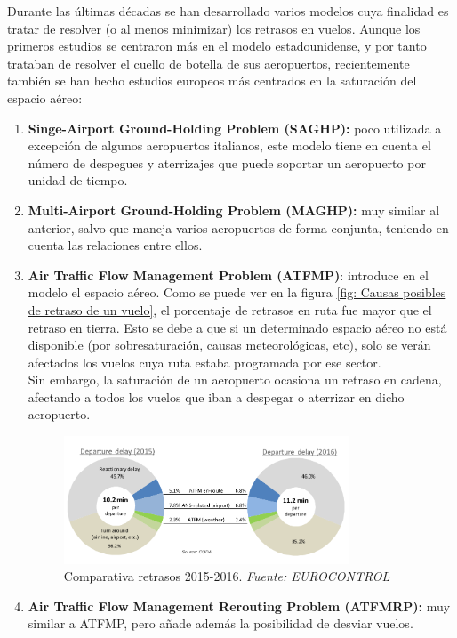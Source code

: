 Durante las últimas décadas se han desarrollado varios modelos cuya finalidad es tratar de resolver (o al menos minimizar) los retrasos en vuelos. Aunque los primeros estudios se centraron más en el modelo estadounidense, y por tanto trataban de resolver el cuello de botella de sus aeropuertos, recientemente también se han hecho estudios europeos más centrados en la saturación del espacio aéreo: 
\begin{enumerate}
	\item \textbf{Singe-Airport Ground-Holding Problem (SAGHP):} poco utilizada a excepción de algunos aeropuertos italianos, este modelo tiene en cuenta el número de despegues y aterrizajes que puede soportar un aeropuerto por unidad de tiempo.
	\item \textbf{Multi-Airport Ground-Holding Problem (MAGHP): }muy similar al anterior, salvo que maneja varios aeropuertos de forma conjunta, teniendo en cuenta las relaciones entre ellos.
	\item \textbf{Air Traffic Flow Management Problem (ATFMP)}: introduce en el modelo el espacio aéreo. Como se puede ver en la figura \ref{fig: Causas posibles de retraso de un vuelo}, el porcentaje de retrasos en ruta fue mayor que el retraso en tierra. Esto se debe a que si un determinado espacio aéreo no está disponible (por sobresaturación, causas meteorológicas, etc), solo se verán afectados los vuelos cuya ruta estaba programada por ese sector.\\
	Sin embargo, la saturación de un aeropuerto ocasiona un retraso en cadena, afectando a todos los vuelos que iban a despegar o aterrizar en dicho aeropuerto.
	\begin{figure}[h]
		\begin{center}
			\centering
			\includegraphics[width=0.8\textwidth]{./imagenes/introduccion/retrasosSalida.png}
			\caption{Comparativa retrasos 2015-2016. \textit{Fuente: EUROCONTROL}}
			\label{fig: Comparativa retrasos 2015-2016}
		\end{center}
	\end{figure}
	\item \textbf{Air Traffic Flow Management Rerouting Problem (ATFMRP): }muy similar a ATFMP, pero añade además la posibilidad de desviar vuelos.

\end{enumerate}
